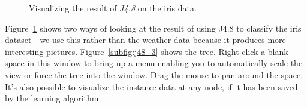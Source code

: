 \begin{figure}[!th]
\centering
{}
\newline
{}
\caption{\label{fig:j48_iris}Visualizing the result of \textit{J4.8} on the iris data.}
\end{figure}

Figure~\ref{fig:j48_iris} shows two ways of looking at the result of
using J4.8 to classify the iris dataset---we use this rather than the
weather data because it produces more interesting
pictures. Figure~\ref{subfig:j48_3} shows the tree. Right-click a
blank space in this window to bring up a menu enabling you to
automatically scale the view or force the tree into the window. Drag
the mouse to pan around the space. It's also possible to visualize the
instance data at any node, if it has been saved by the learning
algorithm.

